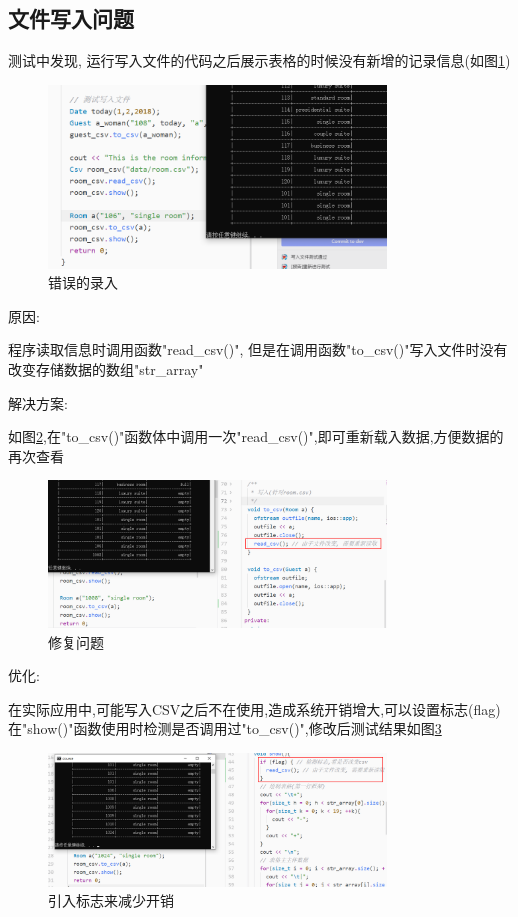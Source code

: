 \documentclass[UTF8]{ctexart}
\begin{document}
  \subsection{文件写入问题}
    测试中发现, 运行写入文件的代码之后展示表格的时候没有新增的记录信息(如图\ref{fig:bug_2})
    \begin{figure}[H]
      \centering
      \includegraphics[width=0.8\textwidth]{bug_2}
      \caption{错误的录入}
      \label{fig:bug_2}
    \end{figure}
    原因:

    程序读取信息时调用函数"read\_csv()", 但是在调用函数"to\_csv()"写入文件时没有改变存储数据的数组"str\_array"


    解决方案:

    如图\ref{fig:bug_2_fixed},在"to\_csv()"函数体中调用一次"read\_csv()",即可重新载入数据,方便数据的再次查看
    \begin{figure}[H]
      \centering
      \includegraphics[width=0.8\textwidth]{bug_2_fixed}
      \caption{修复问题}
      \label{fig:bug_2_fixed}
    \end{figure}

    优化:

    在实际应用中,可能写入CSV之后不在使用,造成系统开销增大,可以设置标志(flag)在"show()"函数使用时检测是否调用过"to\_csv()",修改后测试结果如图\ref{fig:bug_2_more}

    \begin{figure}[H]
      \centering
      \includegraphics[width=0.8\textwidth]{bug_2_more}
      \caption{引入标志来减少开销}
      \label{fig:bug_2_more}
    \end{figure}
\end{document}

